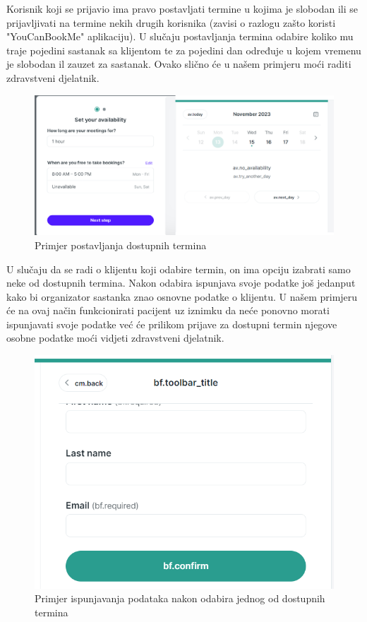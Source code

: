 Korisnik koji se prijavio ima pravo postavljati termine u kojima je slobodan ili se prijavljivati na termine nekih drugih korisnika (zavisi o razlogu zašto koristi "YouCanBookMe" aplikaciju).	U slučaju postavljanja termina odabire koliko mu traje pojedini sastanak sa klijentom te za pojedini dan određuje u kojem vremenu je slobodan il zauzet za sastanak. Ovako slično će u našem primjeru moći raditi zdravstveni djelatnik.

\begin{figure}[H]
	\includegraphics[scale=0.6]{slike/YouCanBookMe-Termin1.PNG} %
	\centering
	\caption{Primjer postavljanja dostupnih termina}
	\label{fig:promjene}
\end{figure}

U slučaju da se radi o klijentu koji odabire termin, on ima opciju izabrati samo neke od dostupnih termina. Nakon odabira ispunjava svoje podatke još jedanput kako bi organizator sastanka znao osnovne podatke o klijentu. U našem primjeru će na ovaj način funkcionirati pacijent uz iznimku da neće ponovno morati ispunjavati svoje podatke već će prilikom prijave za dostupni termin njegove osobne podatke moći vidjeti zdravstveni djelatnik. 

\begin{figure}[H]
	\includegraphics[scale=0.6]{slike/YouCanBookMe-Termin3.PNG} %
	\centering
	\caption{Primjer ispunjavanja podataka nakon odabira jednog od dostupnih termina}
	\label{fig:promjene}
\end{figure}

